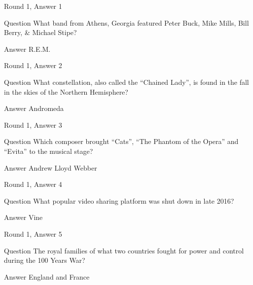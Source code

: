 \documentclass[11pt]{beamer}
\begin{document}
\begin{frame}[t]{Round 1, Answer 1}
\vspace{2em}
\begin{block}{Question}
What band from Athens, Georgia featured Peter Buck, Mike Mills, Bill Berry, \& Michael Stipe\@?
\end{block}
\pause{}
\begin{block}{Answer}
R.E.M.
\end{block}
\end{frame}
    

\begin{frame}[t]{Round 1, Answer 2}
\vspace{2em}
\begin{block}{Question}
What constellation, also called the ``Chained Lady'', is found in the fall in the skies of the Northern Hemisphere\@?
\end{block}
\pause{}
\begin{block}{Answer}
Andromeda
\end{block}
\end{frame}
    

\begin{frame}[t]{Round 1, Answer 3}
\vspace{2em}
\begin{block}{Question}
Which composer brought ``Cats'', ``The Phantom of the Opera'' and ``Evita'' to the musical stage\@?
\end{block}
\pause{}
\begin{block}{Answer}
Andrew Lloyd Webber
\end{block}
\end{frame}
    

\begin{frame}[t]{Round 1, Answer 4}
\vspace{2em}
\begin{block}{Question}
What popular video sharing platform was shut down in late 2016\@?
\end{block}
\pause{}
\begin{block}{Answer}
Vine
\end{block}
\end{frame}
    

\begin{frame}[t]{Round 1, Answer 5}
\vspace{2em}
\begin{block}{Question}
The royal families of what two countries fought for power and control during the 100 Years War\@?
\end{block}
\pause{}
\begin{block}{Answer}
England and France
\end{block}
\end{frame}
    
\end{document}
